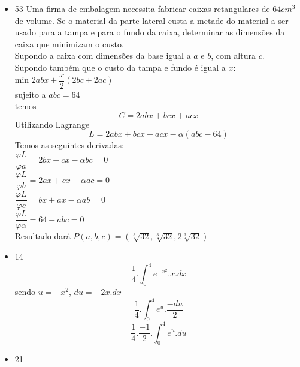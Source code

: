 \documentclass{article}
\begin{document}
\begin{itemize}
	\item 53 Uma firma de embalagem necessita fabricar caixas retangulares de $64 cm^3$ de volume. Se o material da parte lateral custa a metade do material a ser usado para a tampa e para o fundo da caixa, determinar as dimensões da caixa que minimizam o custo.\\
	Supondo a caixa com dimensões da base igual a $a$ e $b$, com altura $c$.\\
	Supondo também  que o custo da tampa e fundo é igual a $x$:\\
	min $2abx+\dfrac{x}{2}(2bc + 2ac)$\\
	sujeito a $abc = 64$\\
	temos
	$$C = 2abx + bcx+acx$$
	Utilizando Lagrange
	$$L = 2abx+bcx+acx - \alpha(abc-64)$$
	Temos as seguintes derivadas:\\
	$\dfrac{\varphi L}{\varphi a} = 2bx+cx-\alpha bc =0$\\
	$\dfrac{\varphi L}{\varphi b} = 2ax + cx- \alpha ac =0$\\
	$\dfrac{\varphi L}{\varphi c} = bx+ax-\alpha ab =0$\\
	$\dfrac{\varphi L}{\varphi \alpha} = 64 - abc =0$\\
	Resultado dará $P(a,b,c) = (\sqrt[3]{32},\sqrt[3]{32},2\sqrt[3]{32})$
	
	\item 14
	$$\dfrac{1}{4}.\int_0^4 e^{-x^2}.x.dx$$
	sendo $u =-x^2$, $du = -2x.dx$
	$$\dfrac{1}{4}.\int_0^4 e^u.\dfrac{-du}{2}$$
	$$\dfrac{1}{4}.\dfrac{-1}{2}.\int_0^4 e^u.du$$
	
	\item 21\\
	

\end{itemize}
\end{document}
